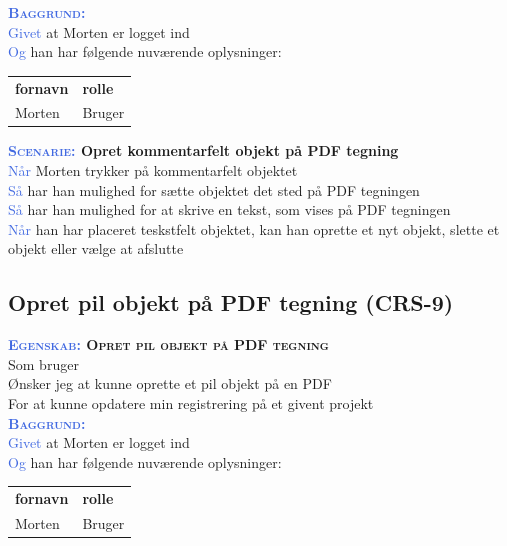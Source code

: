 \textsc{\textcolor{RoyalBlue}{\textbf{Baggrund:}}}\\
\textcolor{RoyalBlue}{Givet} at Morten er logget ind\\
\textcolor{RoyalBlue}{Og} han har følgende nuværende oplysninger:\\
\begin{tabular}{| l | l |}
	\textbf{fornavn} & \textbf{rolle} \\
	Morten & Bruger\\
\end{tabular}

\textbf{\textsc{\textcolor{RoyalBlue}{Scenarie:}} Opret kommentarfelt objekt på PDF tegning}\\
\textcolor{RoyalBlue}{Når} Morten trykker på kommentarfelt objektet\\
\textcolor{RoyalBlue}{Så}  har han mulighed for sætte objektet det sted på PDF tegningen\\
\textcolor{RoyalBlue}{Så}  har han mulighed for at skrive en tekst, som vises på PDF tegningen\\
\textcolor{RoyalBlue}{Når} han har placeret teskstfelt objektet, kan han oprette et nyt objekt, slette et objekt eller vælge at afslutte \\

\clearpage

\subsection{Opret pil objekt på PDF tegning (CRS-9)} \label{sec:USOpretPilObjekt}
\textbf{\textsc{\textcolor{RoyalBlue}{Egenskab:} Opret pil objekt på PDF tegning}}\\
Som bruger\\
Ønsker jeg at kunne oprette et pil objekt på en PDF\\
For at kunne opdatere min registrering på et givent projekt \\

\textsc{\textcolor{RoyalBlue}{\textbf{Baggrund:}}}\\
\textcolor{RoyalBlue}{Givet} at Morten er logget ind\\
\textcolor{RoyalBlue}{Og} han har følgende nuværende oplysninger:\\
\begin{tabular}{| l | l |}
	\textbf{fornavn} & \textbf{rolle} \\
	Morten & Bruger\\
\end{tabular}

